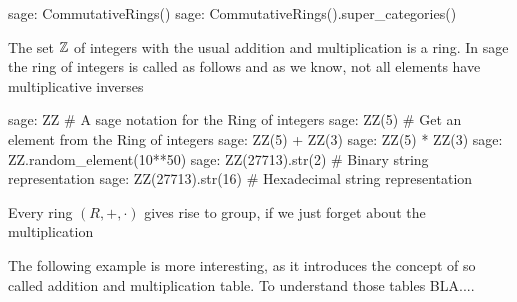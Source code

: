 \begin{sagecommandline}
sage: CommutativeRings()
sage: CommutativeRings().super_categories()
\end{sagecommandline}

\begin{example} The set $\mathbb{Z}$ of integers with the usual addition and multiplication is a ring. In sage the ring of integers is called as follows and as we know, not all elements have multiplicative inverses
\begin{sagecommandline}
sage: ZZ # A sage notation for the Ring of integers
sage: ZZ(5) # Get an element from the Ring of integers
sage: ZZ(5) + ZZ(3)
sage: ZZ(5) * ZZ(3)
sage: ZZ.random_element(10**50)
sage: ZZ(27713).str(2) # Binary string representation
sage: ZZ(27713).str(16) # Hexadecimal string representation
\end{sagecommandline}
\end{example}
\begin{example} Every ring $(R,+,\cdot)$ gives rise to group, if we just forget about the multiplication
\end{example}
The following example is more interesting, as it introduces the concept of so called addition and multiplication table. To understand those tables BLA....
